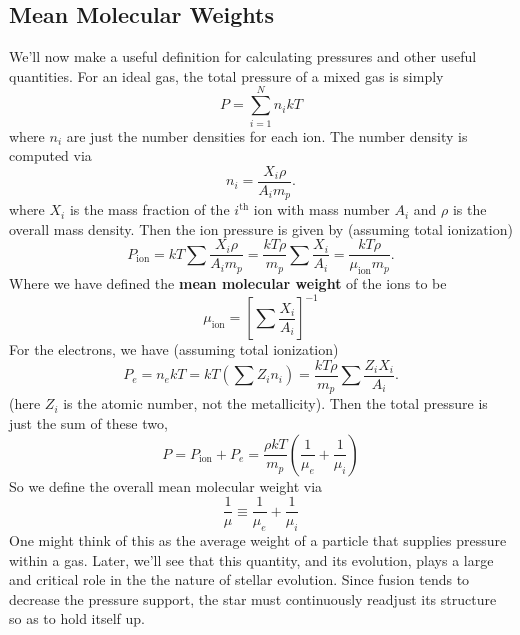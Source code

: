 \documentclass[10pt]{article}
\numberwithin{equation}{section}
\begin{document}
	\subsection{Mean Molecular Weights}
	We'll now make a useful definition for calculating pressures and other 
useful quantities. For an ideal gas, the total pressure of a mixed gas is 
simply
	\begin{equation}
		\label{mmw.1} P=\sum_{i=1}^N n_ikT
	\end{equation}
	where $n_i$ are just the number densities for each ion. The number 
density is computed via
	\begin{equation}
		\label{mmw.2} n_i=\frac{X_i\rho}{A_im_p}.
	\end{equation}
	where $X_i$ is the mass fraction of the $i^{\mathrm{th}}$ ion with mass 
number $A_i$ and $\rho$ is the overall mass density. Then the ion pressure 
is given by (assuming total ionization)
	\begin{equation}
		\label{mmw.3} P_{\mathrm{ion}}=kT\sum\frac{X_i\rho}{A_im_p}=\frac
{kT\rho}{m_p}\sum\frac{X_i}{A_i}=\frac{kT\rho}{\mu_{\mathrm{ion}}m_p}.
	\end{equation}
	Where we have defined the \textbf{mean molecular weight} of the ions to 
be
	\begin{equation}
		\label{mmw.3a} \mu_{\mathrm{ion}}=\left[\sum\frac{X_i}{A_i}\right]^
{-1}
	\end{equation}
	For the electrons, we have (assuming total ionization)
	\begin{equation}
		\label{mmw.4} P_e=n_ekT=kT\left(\sum Z_in_i\right)=\frac{kT\rho}
{m_p}\sum\frac{Z_iX_i}{A_i}.
	\end{equation}
	(here $Z_i$ is the atomic number, not the metallicity). Then the total 
pressure is just the sum of these two,
	\begin{equation}
		\label{mmw.5} P=P_{\mathrm{ion}}+P_e=\frac{\rho kT}{m_p}\left(\frac
{1}{\mu_e}+\frac{1}{\mu_i}\right)
	\end{equation}
	So we define the overall mean molecular weight via
	\begin{equation}
		\frac{1}{\mu}\equiv \frac{1}{\mu_e}+\frac{1}{\mu_i}
	\end{equation}
	One might think of this as the average weight of a particle that 
supplies pressure within a gas. Later, we'll see that this quantity, and 
its evolution, plays a large and critical role in the the nature of stellar 
evolution. Since fusion tends to decrease the pressure support, the star 
must continuously readjust its structure so as to hold itself up.\\
	
\end{document}
